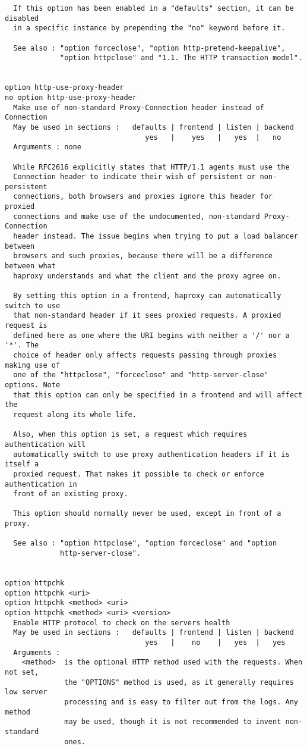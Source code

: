 \begin{verbatim}
  If this option has been enabled in a "defaults" section, it can be disabled
  in a specific instance by prepending the "no" keyword before it.

  See also : "option forceclose", "option http-pretend-keepalive",
             "option httpclose" and "1.1. The HTTP transaction model".


option http-use-proxy-header
no option http-use-proxy-header
  Make use of non-standard Proxy-Connection header instead of Connection
  May be used in sections :   defaults | frontend | listen | backend
                                 yes   |    yes   |   yes  |   no
  Arguments : none

  While RFC2616 explicitly states that HTTP/1.1 agents must use the
  Connection header to indicate their wish of persistent or non-persistent
  connections, both browsers and proxies ignore this header for proxied
  connections and make use of the undocumented, non-standard Proxy-Connection
  header instead. The issue begins when trying to put a load balancer between
  browsers and such proxies, because there will be a difference between what
  haproxy understands and what the client and the proxy agree on.

  By setting this option in a frontend, haproxy can automatically switch to use
  that non-standard header if it sees proxied requests. A proxied request is
  defined here as one where the URI begins with neither a '/' nor a '*'. The
  choice of header only affects requests passing through proxies making use of
  one of the "httpclose", "forceclose" and "http-server-close" options. Note
  that this option can only be specified in a frontend and will affect the
  request along its whole life.

  Also, when this option is set, a request which requires authentication will
  automatically switch to use proxy authentication headers if it is itself a
  proxied request. That makes it possible to check or enforce authentication in
  front of an existing proxy.

  This option should normally never be used, except in front of a proxy.

  See also : "option httpclose", "option forceclose" and "option
             http-server-close".


option httpchk
option httpchk <uri>
option httpchk <method> <uri>
option httpchk <method> <uri> <version>
  Enable HTTP protocol to check on the servers health
  May be used in sections :   defaults | frontend | listen | backend
                                 yes   |    no    |   yes  |   yes
  Arguments :
    <method>  is the optional HTTP method used with the requests. When not set,
              the "OPTIONS" method is used, as it generally requires low server
              processing and is easy to filter out from the logs. Any method
              may be used, though it is not recommended to invent non-standard
              ones.


\end{verbatim}
